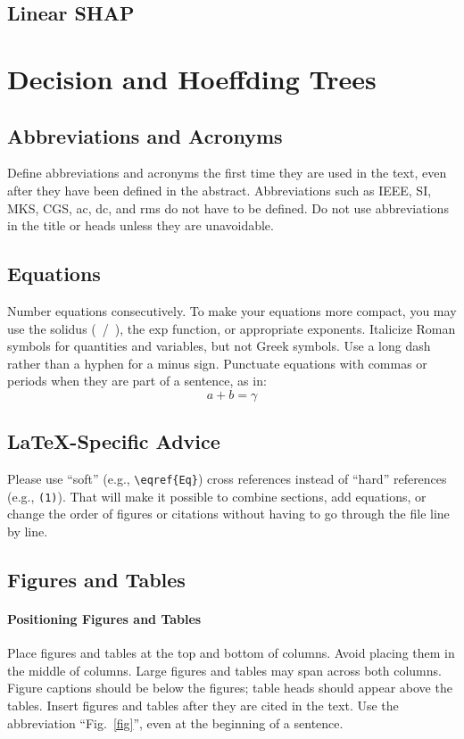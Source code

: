 \documentclass[conference]{IEEEtran}
\begin{document}
\subsection{Linear SHAP}

\section{Decision and Hoeffding Trees}

\subsection{Abbreviations and Acronyms}\label{AA}
Define abbreviations and acronyms the first time they are used in the text, 
even after they have been defined in the abstract. Abbreviations such as 
IEEE, SI, MKS, CGS, ac, dc, and rms do not have to be defined. Do not use 
abbreviations in the title or heads unless they are unavoidable.

\subsection{Equations}
Number equations consecutively. To make your 
equations more compact, you may use the solidus (~/~), the exp function, or 
appropriate exponents. Italicize Roman symbols for quantities and variables, 
but not Greek symbols. Use a long dash rather than a hyphen for a minus 
sign. Punctuate equations with commas or periods when they are part of a 
sentence, as in:
\begin{equation}
a+b=\gamma\label{eq}
\end{equation}

\subsection{\LaTeX-Specific Advice}

Please use ``soft'' (e.g., \verb|\eqref{Eq}|) cross references instead
of ``hard'' references (e.g., \verb|(1)|). That will make it possible
to combine sections, add equations, or change the order of figures or
citations without having to go through the file line by line.

\subsection{Figures and Tables}
\paragraph{Positioning Figures and Tables} Place figures and tables at the top and 
bottom of columns. Avoid placing them in the middle of columns. Large 
figures and tables may span across both columns. Figure captions should be 
below the figures; table heads should appear above the tables. Insert 
figures and tables after they are cited in the text. Use the abbreviation 
``Fig.~\ref{fig}'', even at the beginning of a sentence.
\end{document}
